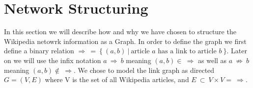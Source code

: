 \section{Network Structuring}
In this section we will describe how and why we have chosen to structure the Wikipedia netowrk information as a Graph. 
In order to define the graph we first define a binary relation $\Rightarrow\ =\ \{\ (a,b)\ |\ \text{article } a \text{ has a link to article } b\ \}$. Later on we will use the infix notation $a\ \Rightarrow\ b$ meaning $(a,b) \in\ \Rightarrow$ as well as $a\ \not\Rightarrow\ b$ meaning $(a,b) \not\in\ \Rightarrow$.
We chose to model the link graph as directed $G = (V,E)$ where V is the set of all Wikipedia articles, and $E\ \subset\ V \times V =\ \Rightarrow$.

